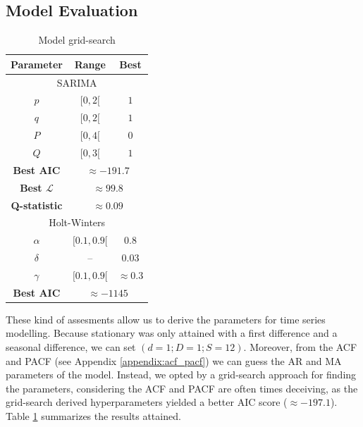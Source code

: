 \documentclass[conference]{IEEEtran}
\begin{document}
\subsection{Model Evaluation}

\begin{table}[hbtp]
    \caption{Model grid-search}
    \centering
    \begin{tabular}{c|c|c}
        Parameter & Range & Best \\
        \hline\hline
        \multicolumn{3}{c}{SARIMA} \\
        \hline
        $p$ & $[0,2[$ & $1$ \\
        $q$ & $[0,2[$ & $1$ \\
        $P$ & $[0,4[$ & $0$ \\
        $Q$ & $[0,3[$ & $1$ \\
        \hline
        \textbf{Best AIC}& \multicolumn{2}{c}{$\approx -191.7$} \\
        \textbf{Best $\mathcal{L}$}& \multicolumn{2}{c}{$\approx 99.8$} \\
        \textbf{Q-statistic}& \multicolumn{2}{c}{$\approx 0.09$} \\
        \hline\hline
        \multicolumn{3}{c}{Holt-Winters} \\
        \hline
        $\alpha$ & $[0.1,0.9[$ & $0.8$ \\
        $\delta$ & -- & $0.03$ \\
        $\gamma$ & $[0.1,0.9[$ & $\approx 0.3$ \\
        \hline\hline
        \textbf{Best AIC}& \multicolumn{2}{c}{$\approx -1145$}
    \end{tabular}
    \label{tab:grid-search}
\end{table}

These kind of assesments allow us to derive the parameters for time series modelling. Because stationary was only attained with a first difference and a seasonal difference, we can set $(d=1;D=1;S=12)$. Moreover, from the ACF and PACF (see Appendix \ref{appendix:acf_pacf}) we can guess the AR and MA parameters of the model. Instead, we opted by a grid-search approach for finding the parameters, considering the ACF and PACF are often times deceiving, as the grid-search derived hyperparameters yielded a better AIC score ($\approx -197.1$). Table \ref{tab:grid-search} summarizes the results attained.
\end{document}
